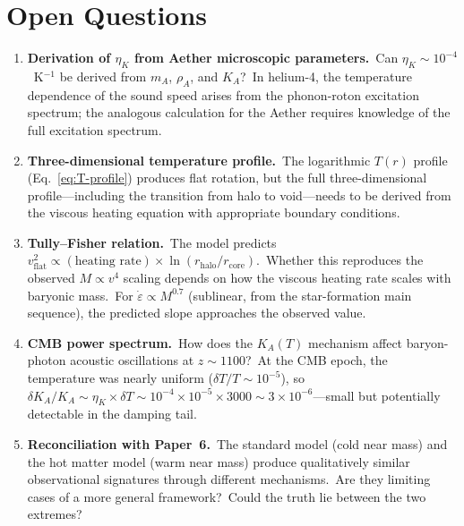 \documentclass[12pt,letterpaper]{article}
\newcommand{\rhoa}{\rho_{\!A}}
\newcommand{\Ka}{K_{\!A}}
\newcommand{\etaK}{\eta_{\!K}}
\begin{document}
\section{Open Questions}
\label{sec:open}

\begin{enumerate}[leftmargin=2em]
  \item \textbf{Derivation of $\etaK$ from Aether microscopic parameters.}\
    Can $\etaK \sim 10^{-4}$~K$^{-1}$ be derived from $m_A$, $\rhoa$, and
    $\Ka$?\ In helium-4, the temperature dependence of the sound speed
    arises from the phonon-roton excitation spectrum; the analogous
    calculation for the Aether requires knowledge of the full excitation
    spectrum.

  \item \textbf{Three-dimensional temperature profile.}\ The logarithmic
    $T(r)$ profile (Eq.~\ref{eq:T-profile}) produces flat rotation, but the
    full three-dimensional profile---including the transition from halo to
    void---needs to be derived from the viscous heating equation with
    appropriate boundary conditions.

  \item \textbf{Tully--Fisher relation.}\ The model predicts
    $v_{\mathrm{flat}}^2 \propto (\text{heating rate}) \times
    \ln(r_{\mathrm{halo}}/r_{\mathrm{core}})$.\ Whether this reproduces the
    observed $M \propto v^4$ scaling depends on how the viscous heating rate
    scales with baryonic mass.\ For $\dot\varepsilon \propto M^{0.7}$
    (sublinear, from the star-formation main sequence), the predicted slope
    approaches the observed value.

  \item \textbf{CMB power spectrum.}\ How does the $\Ka(T)$ mechanism affect
    baryon-photon acoustic oscillations at $z \sim 1100$?\ At the CMB epoch,
    the temperature was nearly uniform ($\delta T/T \sim 10^{-5}$), so
    $\delta\Ka/\Ka \sim \etaK \times \delta T \sim 10^{-4} \times 10^{-5}
    \times 3000 \sim 3 \times 10^{-6}$---small but potentially detectable in
    the damping tail.

  \item \textbf{Reconciliation with Paper~6.}\ The standard model (cold near
    mass) and the hot matter model (warm near mass) produce qualitatively
    similar observational signatures through different mechanisms.\ Are they
    limiting cases of a more general framework?\ Could the truth lie between
    the two extremes?


\end{enumerate}
\end{document}
